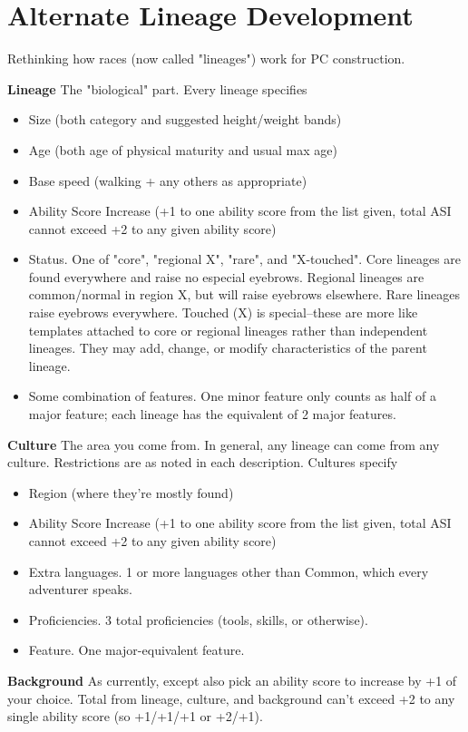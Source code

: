 \chapter{Alternate Lineage Development}\label{ch:alternate-lineage-construction} 
Rethinking how races (now called "lineages") work for PC construction.

\textbf{Lineage} The "biological" part. Every lineage specifies

\begin{itemize}
\item Size (both category and suggested height/weight bands)
\item Age (both age of physical maturity and usual max age)
\item Base speed (walking + any others as appropriate)
\item Ability Score Increase (+1 to one ability score from the list given, total ASI cannot exceed +2 to any given ability score)
\item Status. One of "core", "regional X", "rare", and "X-touched". Core lineages are found everywhere and raise no especial eyebrows. Regional lineages are common/normal in region X, but will raise eyebrows elsewhere. Rare lineages raise eyebrows everywhere. Touched (X) is special--these are more like templates attached to core or regional lineages rather than independent lineages. They may add, change, or modify characteristics of the parent lineage.
\item Some combination of features. One minor feature only counts as half of a major feature; each lineage has the equivalent of 2 major features.
\end{itemize}

\textbf{Culture} The area you come from. In general, any lineage can come from any culture. Restrictions are as noted in each description. Cultures specify
\begin{itemize}
\item Region (where they're mostly found)
\item Ability Score Increase (+1 to one ability score from the list given, total ASI cannot exceed +2 to any given ability score)
\item Extra languages. 1 or more languages other than Common, which every adventurer speaks.
\item Proficiencies. 3 total proficiencies (tools, skills, or otherwise).
\item Feature. One major-equivalent feature.
\end{itemize}
\textbf{Background} As currently, except also pick an ability score to increase by +1 of your choice. Total from lineage, culture, and background can't exceed +2 to any single ability score (so +1/+1/+1 or +2/+1).

